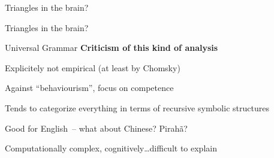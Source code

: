 \documentclass[aspectratio=169,cramped]{beamer}
\let\tempone\itemize
\let\temptwo\enditemize
\renewenvironment{itemize}{\tempone\addtolength{\itemsep}{-0\baselineskip}\addtolength{\parskip}{-0.2\baselineskip}}{\temptwo}
\begin{document}
\begin{frame}{Triangles in the brain?}
  \begin{figure}
    \centering
    \vspace{-2cm}
    \hspace{1cm}
  \end{figure}
\end{frame}

\begin{frame}{Triangles in the brain?}
  \begin{figure}
    \centering
    \vspace{-2cm}
    \hspace{1cm}
  \end{figure}
\end{frame}

\begin{frame}{Universal Grammar}
	\textbf{Criticism of this kind of analysis}
  \begin{itemize}
  \item Explicitely not empirical (at least by Chomsky)
    \begin{itemize}
    \item Against ``behaviourism'', focus on competence
    \item Tends to categorize everything in terms of recursive symbolic structures
    \item Good for English~-- what about Chinese? Pirah\~{a}?
    \end{itemize}
  \item Computationally complex, cognitively\ldots difficult to explain
  \end{itemize}
\end{frame}
\end{document}
